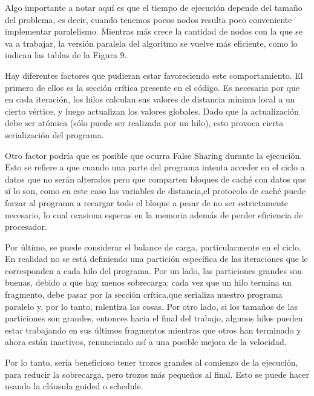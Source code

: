 \documentclass[11pt]{article}
\begin{document}
\par
Algo importante a notar aquí es que el tiempo de ejecución depende del tamaño del problema, es decir, cuando tenemos pocos nodos resulta poco conveniente implementar paralelismo. Mientras más crece la cantidad de nodos con la que se va a trabajar, la versión paralela del algoritmo se vuelve más eficiente, como lo indican las tablas de la Figura 9. 
\par 
Hay diferentes factores que pudieran estar favoreciendo este comportamiento. El primero de ellos es la sección crítica presente en el código. Es necesaria por que en cada iteración, los hilos calculan sus valores de distancia mínima local a un cierto vértice, y luego actualizan los valores globales. Dado que la actualización debe ser atómica (sólo puede ser realizada por un hilo), esto provoca cierta serialización del programa.
\par
Otro factor podría que es posible que ocurra False Sharing durante la ejecución. Esto se refiere a que cuando una parte del programa intenta acceder en el ciclo a datos que no serán alterados pero que comparten bloques de caché con datos que sí lo son, como en este caso las variables de distancia,el protocolo de caché puede forzar al programa a recargar todo el bloque a pesar de no ser estrictamente necesario, lo cual ocasiona esperas en la memoria además de perder eficiencia de procesador.

\par
Por último, se puede considerar el balance de carga, particularmente en el ciclo. En realidad no se está definiendo una partición específica de las iteraciones que le corresponden a cada hilo del programa. Por un lado, las particiones grandes son buenas, debido a que hay menos sobrecarga: cada vez que un hilo termina un fragmento, debe pasar por la sección crítica,que serializa nuestro programa paralelo y, por lo tanto, ralentiza las cosas. Por otro lado, si los tamaños de las particiones son grandes, entonces hacia el final del trabajo, algunos hilos pueden estar trabajando en sus últimos fragmentos mientras que otros han terminado y ahora están inactivos, renunciando así a una posible mejora de la velocidad.
\par
Por lo tanto, sería beneficioso tener trozos grandes al comienzo de la ejecución, para reducir la sobrecarga, pero trozos más pequeños al final. 
Esto se puede hacer usando la cláusula guided o schedule.
\end{document}
